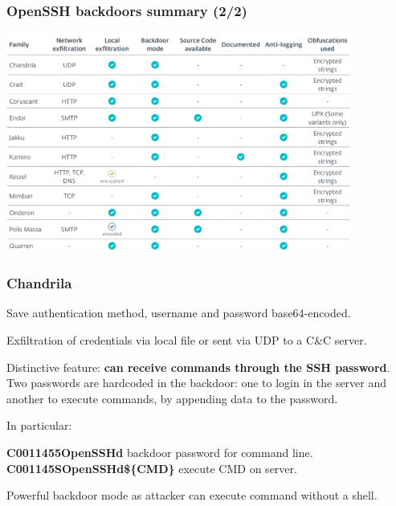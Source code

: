 \begin{frame}
	\frametitle{OpenSSH backdoors summary (2/2)}
	
   \begin{center}    
   \includegraphics[width=0.85\textwidth]{images/families2}
   \end{center}

\end{frame}


\begin{frame}
	\frametitle{Chandrila}
	
	Save authentication method, username and password base64-encoded.
	
	\bigskip
	
	Exfiltration of credentials via local file or sent via UDP to a C\&C server.
	
	\bigskip
	
	Distinctive feature: \textbf{can receive commands through the SSH password}.\\
	Two passwords are hardcoded in the backdoor: one to login in the server and another to execute commands, by appending data to the password.
	
	\medskip
	
	In particular:
	
	\smallskip
	
	\textbf{C0011455OpenSSHd} backdoor password for command line.
	\textbf{C001145SOpenSSHd\$\{CMD\}} execute CMD on server.

	\bigskip

  Powerful backdoor mode as attacker can execute command without a shell.
  
\end{frame}


